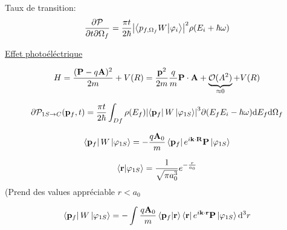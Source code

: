 Taux de transition:
$$\frac{\partial \mathcal{P} }{\partial t \partial \Omega_f} = \frac{\pi{}t}{2\hbar} \abs{\bra{p_{f,\Omega_f}W} \ket{\varphi_i}}^2 \rho(E_i + \hbar\omega) $$ 

\underline{Effet photoéléctrique}

$$H =\frac{(\vb{P} -q\vb{A})^2}{2m} + V(R) = \frac{\vb{p}^2}{2m} \frac{q}{m} \vb{P} \cdot \vb{A} + \underbrace{\mathcal{O}(A^2)}_{\approx 0} + V(R)  $$ 

$$\partial \mathcal{P}_{1S\to C} (\vb{p}_f ,t) = \frac{\pi{}t}{2\hbar} \int_{Df} \rho(E_f)  \abs{\bra{\vb{p}_f} W\ket{\varphi_{1S} }}^3 \partial (E_f E_i -\hbar \omega) \dd E_f \dd \Omega_f$$ 


$$\bra{\vb{p}_f}W \ket{\varphi_{1S} } = - \frac{q\vb{A}_0}{m} \bra{\vb{p}_f} e^{i \vb{k} \cdot \vb{R}} \vb{P} \ket{\varphi_{1S} } $$ 

$$\braket{\vb{r}}{\varphi_{1S} } = \frac{1}{\sqrt{\pi{}a_0^3}} e^{- \frac{r}{a_0} }$$ 
(Prend des values appréciable $r < a_0$ 

$$\bra{\vb{p}_f} W \ket{\varphi_{1S}} = - \int \frac{q \vb{A}_0}{m} \bra{\vb{p}_f}\ket{\vb{r}} \bra{\vb{r}} e^{i \vb{k} \cdot  \vb{r}} \vb{P} \ket{\varphi_{1S} } \dd^3 r$$ 
$$$$ 


